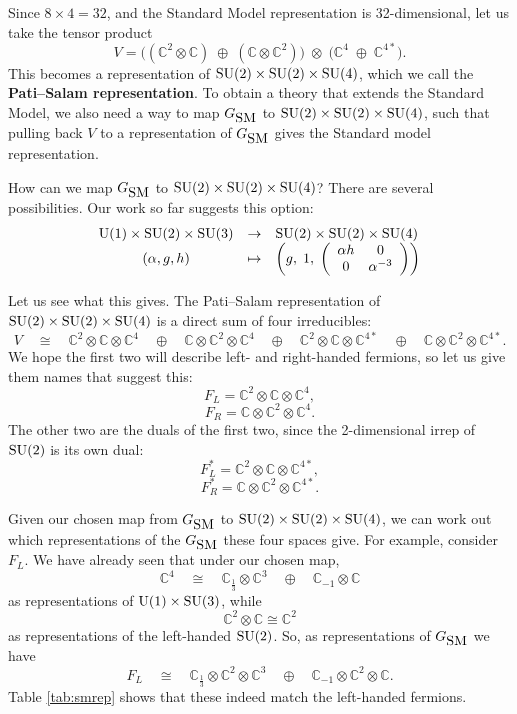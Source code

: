 \documentclass{article}
\newcommand{\C}{{\mathbb C}}  %
\newcommand{\U}{{\rm U}}    %
\newcommand{\SU}{{\rm SU}}    %
\newcommand{\iso}{\cong} %
\newcommand{\third}{\frac{1}{3}} %
\newcommand{\GSM}{{G_{\mbox{\rm SM}}}}  %
\begin{document}
Since $8 \times 4 = 32$, and the Standard Model representation is 
32-dimensional, let us take the tensor product
\[     V =   \big((\C^2 \otimes \C) \; \oplus \; (\C \otimes \C^2)\big)
\; \otimes \; \big(\C^4 \; \oplus \; \C^{4*}\big). \]
This becomes a representation of $\SU(2) \times \SU(2) \times \SU(4)$,
which we call the {\bf Pati--Salam representation}.
To obtain a theory that extends the Standard Model, 
we also need a way to map $\GSM$ to $\SU(2) \times \SU(2) \times 
\SU(4)$, such that pulling back $V$ to a representation of $\GSM$ 
gives the Standard model representation.

How can we map $\GSM$ to $\SU(2) \times \SU(2) \times \SU(4)$?  There
are several possibilities.  Our work so far suggests this option:
\[ \begin{array}{ccl}
\U(1) \times \SU(2) \times \SU(3) &\to& \SU(2) \times \SU(2) \times \SU(4) \\
  (\alpha, g, h)  &\mapsto&  
\left( g, \; 1, \;
\left(
\begin{array}{c c}
	\alpha h & 0 \\
	0 & \alpha^{-3}
\end{array}
\right) 
\right)
\end{array}
\]

Let us see what this gives.  The Pati--Salam representation
of $\SU(2) \times \SU(2) \times \SU(4)$ is a direct sum
of four irreducibles:
\[   V \quad \iso \quad 
\C^2 \otimes \C \otimes \C^4 \quad \oplus \quad
\C \otimes \C^2 \otimes \C^4 \quad \oplus \quad
\C^2 \otimes \C \otimes \C^{4*} \quad \oplus \quad
\C \otimes \C^2 \otimes \C^{4*}.
\]
We hope the first two will describe left- and right-handed
fermions, so let us give them names that suggest this:
\[         F_L = \C^2 \otimes \C \otimes \C^4,  \]
\[         F_R = \C \otimes \C^2 \otimes \C^4 . \]
The other two are the duals of the first two, since the 2-dimensional
irrep of $\SU(2)$ is its own dual:
\[         F_L^* = \C^2 \otimes \C \otimes \C^{4*},   \]
\[         F_R^* = \C \otimes \C^2 \otimes \C^{4*} . \]

Given our chosen map from $\GSM$ to $\SU(2) \times \SU(2) \times \SU(4)$,
we can work out which representations of the $\GSM$ these four spaces give.
For example, consider $F_L$.   We have already seen that under our
chosen map, 
\[ \C^4 \quad \iso \quad
\C_{\third} \otimes \C^3 \quad \oplus \quad \C_{-1} \otimes \C \]
as representations of $\U(1) \times \SU(3)$, while
\[  \C^2 \otimes \C \iso \C^2 \] 
as representations of the left-handed $\SU(2)$. 
So, as representations of $\GSM$ we have
\[         F_L \quad \iso 
\quad \C_{\third} \otimes \C^2 \otimes \C^3  \quad \oplus 
\quad \C_{-1} \otimes \C^2 \otimes \C .\]
Table \ref{tab:smrep} shows that these indeed match the left-handed
fermions.
\end{document}
